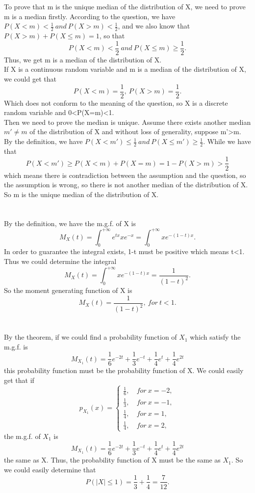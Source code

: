 \documentclass[10.5pt]{article}
\begin{document}
\section{}
To prove that m is the unique median of the distribution of X, we need to prove m is a median firstly. According to the question, we have $P(X<m)<\frac{1}{2}~and~P(X>m)<\frac{1}{2}$, and we also know that $P(X>m)+P(X\leqslant m)=1$, so that $$P(X<m)<\frac{1}{2}~and~P(X\leqslant m)\geqslant \frac{1}{2}.$$\indent Thus, we get m is a median of the distribution of X.\\\indent
If X is a continuous random variable and m is a median of the distribution of X, we could get that $$P(X<m)=\frac{1}{2},~P(X>m)=\frac{1}{2}.$$\indent
Which does not conform to the meaning of the question, so X is a discrete random variable and 0<P(X=m)<1.\\\indent
Then we need to prove the median is unique. Assume there exists another median $m'\neq m$ of the distribution of X and without loss of generality, suppose m'>m. By the definition, we have $P(X<m')\leqslant\frac{1}{2}~and~P(X\leqslant m')\geqslant\frac{1}{2}$. While we have that $$P(X<m')\geqslant P(X<m)+P(X=m)=1-P(X>m)>\frac{1}{2}$$\indent
which means there is contradiction between the assumption and the question, so the assumption is wrong, so there is not another median of the distribution of X. So m is the unique median of the distribution of X.

\section{}
By the definition, we have the m.g.f. of X is $$M_X(t) = \int_0^{+\infty} e^{tx}xe^{-x} = \int_0^{+\infty} xe^{-(1-t)x}.$$\indent
In order to guarantee the integral exists, 1-t must be positive which means t<1. Thus we could determine the integral $$M_X(t) = \int_0^{+\infty} xe^{-(1-t)x} = \frac{1}{(1-t)^2}.$$\indent
So the moment generating function of X is $$M_X(t) = \frac{1}{(1-t)^2},~for ~t<1.$$

\section{}
By the theorem, if we could find a probability function of $X_1$ which satisfy the m.g.f. is $$M_{X_1}(t) = \frac{1}{6}e^{-2t} + \frac{1}{3}e^{-t} + \frac{1}{4}e^{t} + \frac{1}{4}e^{2t}$$\indent this probability function must be the probability function of X. We could easily get that if $$p_{X_1}(x) = \begin{cases}
    \frac{1}{6}, & ~for ~x=-2,\\
    \frac{1}{3}, & ~for ~x=-1,\\
    \frac{1}{4}, & ~for ~x=1,\\
    \frac{1}{4}, & ~for ~x=2,
\end{cases}$$\indent
the m.g.f. of $X_1$ is $$M_{X_1}(t)=\frac{1}{6}e^{-2t} + \frac{1}{3}e^{-t} + \frac{1}{4}e^{t} + \frac{1}{4}e^{2t}$$\indent
the same as X. Thus, the probability function of X must be the same as $X_1$. So we could easily determine that $$P(\left\lvert X\right\rvert \leqslant 1) = \frac{1}{3} + \frac{1}{4} = \frac{7}{12}.$$
\end{document}
